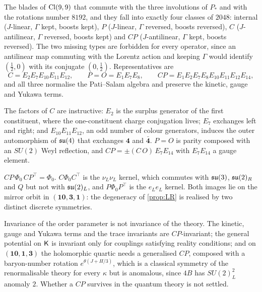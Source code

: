 \begin{theorem}
\label{thm:fourclasses}
The blades of $\mathrm{Cl}(9,9)$ that commute with the three involutions of $P_*$ and with the rotations number $8192$, and they fall into exactly four classes of $2048$:
internal ($J$-linear, $\Gamma$ kept, boosts kept), $P$ ($J$-linear, $\Gamma$ reversed, boosts reversed), $C$ ($J$-antilinear, $\Gamma$ reversed, boosts kept) and $CP$
($J$-antilinear, $\Gamma$ kept, boosts reversed). The two missing types are forbidden for every operator, since an antilinear map commuting with the Lorentz action and
keeping $\Gamma$ would identify $(\tfrac12,0)$ with its conjugate $(0,\tfrac12)$. Representatives are
\[
C=E_2E_7E_{10}E_{11}E_{12},\qquad P=O=E_1E_7E_8,\qquad CP=E_1E_2E_7E_8E_{10}E_{11}E_{12}E_{14},
\]
and all three normalise the Pati--Salam algebra and preserve the kinetic, gauge and Yukawa terms.
\end{theorem}

The factors of $C$ are instructive: $E_2$ is the surplus generator of the first constituent, where the one-constituent charge conjugation lives; $E_7$
exchanges left and right; and $E_{10}E_{11}E_{12}$, an odd number of colour generators, induces the outer automorphism of $\mathfrak{su}(4)$ that exchanges $\mathbf4$ and
$\bar{\mathbf4}$. $P=O$ is parity composed with an $SU(2)$ Weyl reflection, and $CP=\pm(C\,O)\,E_7E_{14}$ with $E_7E_{14}$ a gauge element.

\begin{theorem}
\label{thm:vacCP}
$CP\,\Phi_0\,CP^{\!\top}=\Phi_0$. $C\Phi_0C^{\!\top}$ is the $\nu_L\nu_L$ kernel, which commutes with $\mathfrak{su}(3)$, $\mathfrak{su}(2)_R$ and $Q$ but not with $\mathfrak{su}(2)_L$, and
$P\Phi_0P^{\!\top}$ is the $e_Le_L$ kernel. Both images lie on the mirror orbit in $(\mathbf{10},\mathbf3,\mathbf1)$: the degeneracy of \cref{prop:LR} is realised by two distinct
discrete symmetries.
\end{theorem}

Invariance of the order parameter is not invariance of the theory. The kinetic, gauge and Yukawa terms and the trace invariants are $CP$-invariant; the general
potential on $\mathsf K$ is invariant only for couplings satisfying reality conditions; and on $(\mathbf{10},\mathbf1,\mathbf3)$ the holomorphic quartic needs a generalised $CP$,
composed with a baryon-number rotation $e^{\theta(J+H/3)}$, which is a classical symmetry of the renormalisable theory for every $\kappa$ but is anomalous, since $4B$
has $SU(2)_L^2$ anomaly $2$. Whether a $CP$ survives in the quantum theory is not settled.

